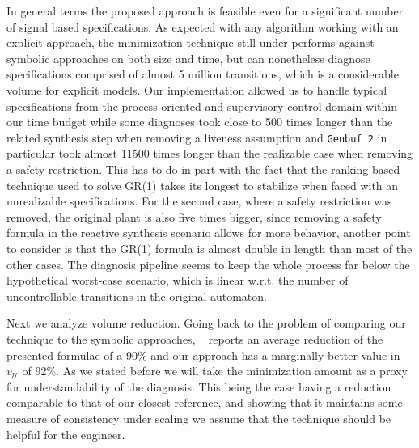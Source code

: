 In general terms the proposed approach is feasible even for a significant number of signal based specifications. 
As expected with any algorithm working with an explicit approach, the minimization technique still under performs against symbolic approaches on both size and time, but can nonetheless diagnose specifications comprised of almost 5 million transitions, which is a considerable volume for explicit models.  
Our implementation allowed us to handle typical specifications from the process-oriented and supervisory control domain within our time budget while some diagnoses took close to 500 times longer than the related synthesis step when removing a liveness assumption and \texttt{Genbuf 2} in particular took almost 11500 times longer than the realizable case when removing a safety restriction. This has to do in part with the fact that the ranking-based technique used to solve GR(1) takes its longest to stabilize when faced with an unrealizable specifications. For the second case, where a safety restriction was removed, the original plant is also five times bigger, since removing a safety formula in the reactive synthesis scenario allows for more behavior, another point to consider is that the GR(1) formula is almost double in length than most of the other cases. 
The diagnosis pipeline seems to keep the whole process far below the hypothetical worst-case scenario, which is linear w.r.t. the number of uncontrollable transitions in the original automaton.  

Next we analyze volume reduction. Going back to the problem of comparing our technique to the symbolic approaches, ~\cite{DBLP:conf/hvc/KonighoferHB10} reports an average reduction of the presented formulae of a 90\% and our approach has a marginally better value in $v_{\mathcal{U}}$ of 92\%.
As we stated before we will take the minimization amount as a proxy for understandability of the diagnosis. This being the case having a reduction comparable to that of our closest reference, and showing that it maintains some measure of consistency under scaling we assume that the technique should be helpful for the engineer.

